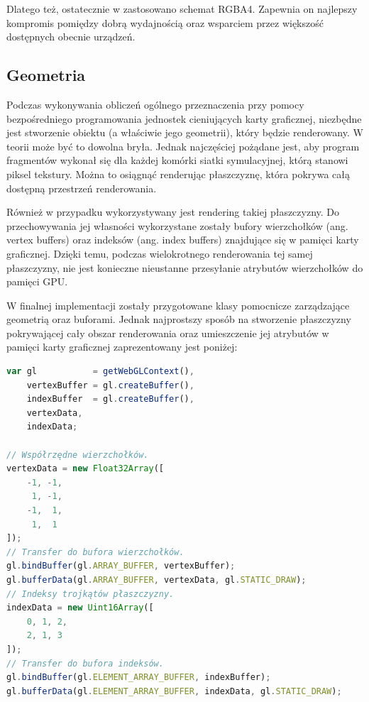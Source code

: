 Dlatego też, ostatecznie w  zastosowano schemat RGBA4. Zapewnia on
najlepszy kompromis pomiędzy dobrą wydajnością oraz wsparciem przez większość
dostępnych obecnie urządzeń.

\subsection{Geometria}

Podczas wykonywania obliczeń ogólnego przeznaczenia przy pomocy bezpośredniego
programowania jednostek cieniujących karty graficznej, niezbędne jest
stworzenie obiektu (a właściwie jego geometrii), który będzie renderowany. W
teorii może być to dowolna bryła. Jednak najczęściej pożądane jest, aby
program fragmentów wykonał się dla każdej komórki siatki symulacyjnej, którą
stanowi piksel tekstury. Można to osiągnąć renderując płaszczyznę, która
pokrywa całą dostępną przestrzeń renderowania.

Również w przypadku \en wykorzystywany jest rendering takiej płaszczyzny. Do
przechowywania jej własności wykorzystane zostały bufory wierzchołków (ang.
vertex buffers) oraz indeksów (ang. index buffers) znajdujące się w pamięci
karty graficznej. Dzięki temu, podczas wielokrotnego renderowania tej samej
płaszczyzny, nie jest konieczne nieustanne przesyłanie atrybutów wierzchołków
do pamięci GPU.

W finalnej implementacji \en zostały przygotowane klasy pomocnicze
zarządzające geometrią oraz buforami. Jednak najprostszy sposób na stworzenie
płaszczyzny pokrywającej cały obszar renderowania oraz umieszczenie jej
atrybutów w pamięci karty graficznej zaprezentowany jest poniżej:

\begin{lstlisting}[language=JavaScript, caption=Definicja geometrii
płaszczyzny pokrywającej cały obszar renderowania]
var gl           = getWebGLContext(),
    vertexBuffer = gl.createBuffer(),
    indexBuffer  = gl.createBuffer(),
    vertexData,
    indexData;

// Współrzędne wierzchołków.
vertexData = new Float32Array([
    -1, -1, 
     1, -1,
    -1,  1,
     1,  1
]);
// Transfer do bufora wierzchołków.
gl.bindBuffer(gl.ARRAY_BUFFER, vertexBuffer);
gl.bufferData(gl.ARRAY_BUFFER, vertexData, gl.STATIC_DRAW);
// Indeksy trojkątów płaszczyzny.
indexData = new Uint16Array([
    0, 1, 2,
    2, 1, 3
]);
// Transfer do bufora indeksów.
gl.bindBuffer(gl.ELEMENT_ARRAY_BUFFER, indexBuffer);
gl.bufferData(gl.ELEMENT_ARRAY_BUFFER, indexData, gl.STATIC_DRAW);
\end{lstlisting}

